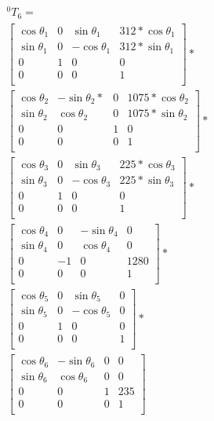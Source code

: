 \begin{multline}
^0T_6=\\
\begin{bmatrix}
\cos\theta_1 & 0 & \sin\theta_1 & 312*\cos\theta_1 \\
\sin\theta_1 & 0 & -\cos\theta_1 & 312*\sin\theta_1 \\ %
0 & 1 & 0 & 0 \\
0 & 0 & 0 & 1 \\
\end{bmatrix}
*\\
\begin{bmatrix}
\cos\theta_2 & -\sin\theta_2* & 0 & 1075*\cos\theta_2 \\
\sin\theta_2 & \cos\theta_2 & 0 & 1075*\sin\theta_2 \\ %
0 & 0 & 1 & 0 \\
0 & 0 & 0 & 1 \\
\end{bmatrix}
*\\
\begin{bmatrix}
\cos\theta_3 & 0 & \sin\theta_3 & 225*\cos\theta_3 \\
\sin\theta_3 & 0 & -\cos\theta_3 & 225*\sin\theta_3 \\  %
0 & 1 & 0 & 0 \\
0 & 0 & 0 & 1 \\
\end{bmatrix}
*\\
\begin{bmatrix}
\cos\theta_4 & 0 & -\sin\theta_4 & 0 \\
\sin\theta_4 & 0 & \cos\theta_4 & 0 \\%
0 & -1 & 0 & 1280 \\
0 & 0 & 0 & 1 \\
\end{bmatrix}
*\\
\begin{bmatrix}
\cos\theta_5 & 0 & \sin\theta_5 & 0 \\
\sin\theta_5 & 0 & -\cos\theta_5 & 0 \\%
0 & 1 & 0 & 0 \\
0 & 0 & 0 & 1 \\
\end{bmatrix}
*\\
\begin{bmatrix}
\cos\theta_6 & -\sin\theta_6 & 0 & 0 \\
\sin\theta_6 & \cos\theta_6 & 0 & 0 \\%
0 & 0 & 1 & 235 \\
0 & 0 & 0 & 1 \\
\end{bmatrix}
\phantom{*}\\
\end{multline}
